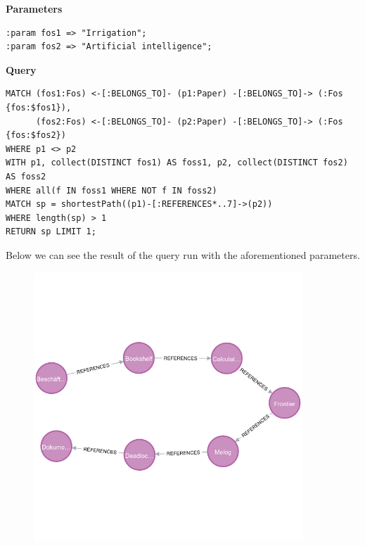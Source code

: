 \begin{enumerate}
    \textbf{Parameters}
    \begin{lstlisting}[label={lst:parameters_query15neo4j}]
:param fos1 => "Irrigation";
:param fos2 => "Artificial intelligence";
    \end{lstlisting}
    \textbf{Query}
    \begin{lstlisting}[label={lst:query15neo4j}]
MATCH (fos1:Fos) <-[:BELONGS_TO]- (p1:Paper) -[:BELONGS_TO]-> (:Fos {fos:$fos1}),
      (fos2:Fos) <-[:BELONGS_TO]- (p2:Paper) -[:BELONGS_TO]-> (:Fos {fos:$fos2})
WHERE p1 <> p2
WITH p1, collect(DISTINCT fos1) AS foss1, p2, collect(DISTINCT fos2) AS foss2
WHERE all(f IN foss1 WHERE NOT f IN foss2)
MATCH sp = shortestPath((p1)-[:REFERENCES*..7]->(p2))
WHERE length(sp) > 1
RETURN sp LIMIT 1;
    \end{lstlisting}
    Below we can see the result of the query run with the aforementioned parameters.
    \begin{figure}[H]
        \begin{center}
            \includegraphics[trim={0 6cm 0 6cm}, clip, width=0.9\textwidth]{Images/query15neo4j}
            \label{fig:query15neo4j}%
        \end{center}
    \end{figure}
\end{enumerate}
